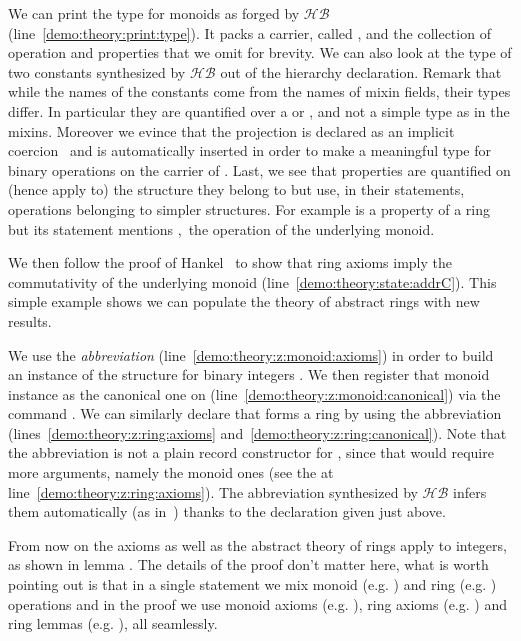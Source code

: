 \documentclass[a4paper,UKenglish,cleveref, autoref]{lipics-v2019}
\newcommand{\HB}{\ensuremath{\mathcal{HB}}}
\newcommand{\mixin}{mixin}
\newcommand{\mixins}{mixins}
\newcommand{\phantterm}{abbreviation}
\theoremstyle{implem}
\theoremstyle{implem}
\theoremstyle{command}
\begin{document}
We can print the type for monoids as forged by \HB{} (line~\ref{demo:theory:print:type}).
It packs a carrier, called , and the collection of operation and
properties that we omit for brevity.  We can also look at the type of two
constants synthesized by \HB{} out of the hierarchy declaration. Remark that
while the names of the constants come from the names of \mixin{} fields,
their types differ.
In particular they are quantified over a  or ,
and not a simple type  as in the \mixins{}. Moreover we evince that
the  projection is declared as an implicit coercion~\cite{Saibi97}
and is automatically inserted in order to make  a meaningful
type for binary operations on the carrier of . Last, we see that
properties are quantified on (hence apply to) the structure they belong to but
use, in their statements, operations belonging to simpler structures.
For example  is a property of a ring but  its statement mentions ,\
the operation of the underlying monoid.

We then follow the proof of Hankel~\cite{nearrings} to show that
ring axioms imply the commutativity of the underlying monoid
(line~\ref{demo:theory:state:addrC}). This simple example shows we can
populate the theory of abstract rings with new results.

We use the  \emph{\phantterm{}}
(line~\ref{demo:theory:z:monoid:axioms})
in order to build an instance of the 
structure for binary integers .
We then register that monoid instance as the canonical one on 
(line~\ref{demo:theory:z:monoid:canonical}) via the command
.
We can similarly declare that  forms a ring by using
the  \phantterm{}
(lines~\ref{demo:theory:z:ring:axioms} and~\ref{demo:theory:z:ring:canonical}).
Note that the \coq{Ring_of_Monoid.Axioms} \phantterm{} is not
a plain record constructor for , since that
would require more arguments, namely the monoid ones (see the \coq{_}
at line~\ref{demo:theory:z:ring:axioms}). The
\phantterm{} synthesized by \HB{} infers them automatically
(as in~\cite[Section 7]{DBLP:conf/itp/MahboubiT13}) thanks to the 
declaration given just above.

From now on the axioms as well as the abstract theory of rings apply to
integers, as shown in lemma \coq{exercise}. The details of the proof
don't matter here, what is worth pointing out is that in a single
statement we mix monoid (e.g. \coq{+}) and ring (e.g. \coq{-}) operations and in the
proof we use monoid axioms (e.g. \coq{addrA}), ring axioms
(e.g. ) and ring lemmas (e.g. ), all seamlessly.
\end{document}
